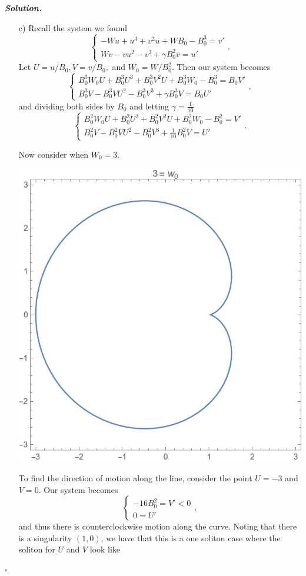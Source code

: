 \documentclass[12pt]{report}
\newenvironment{solution}[1][\it{Solution}]{\textbf{#1. } }{$\square$}
\begin{document}
\begin{solution}
\begin{enumerate}
        \item[c)]
        Recall the system we found
        \[
            \begin{cases}
                -Wu + u^3 + v^2u + WB_0 - B_0^3 = v'\\
                Wv - vu^2 - v^3 + \gamma B_0^2 v = u'
            \end{cases}.
        \]
        Let $U = u/B_0, V = v/B_0,$ and $W_0 = W/B_0^2$. Then our system becomes
        \[ 
            \begin{cases}
                B_0^3W_0U + B_0^3U^3 + B_0^3V^2U + B_0^3W_0 - B_0^3 = B_0V'\\
                B_0^3V - B_0^3VU^2 - B_0^3V^3 + \gamma B_0^3 V = B_0U'
            \end{cases},
        \]
        and dividing both sides by $B_0$ and letting $\gamma = \frac{1}{10}$
        \[ 
            \begin{cases}
                B_0^2W_0U + B_0^2U^3 + B_0^2V^2U + B_0^2W_0 - B_0^2 = V'\\
                B_0^2V - B_0^2VU^2 - B_0^2V^3 + \frac{1}{10} B_0^2 V = U'
            \end{cases}.
        \]
        
        \noindent
        Now consider when $W_0 = 3$.

        \begin{center}
            \includegraphics[width=.5\linewidth]{plots/1-1.jpg}
        \end{center}

        To find the direction of motion along the line, consider the point $U = -3$ and $V = 0$. Our system becomes
        \[ 
            \begin{cases}
                -16B_0^2 = V' < 0\\
                0 = U'
            \end{cases},
        \]
        and thus there is counterclockwise motion along the curve. Noting that there is a singularity $(1,0)$, we have that this is a one soliton case where the soliton for $U$ and $V$ look like


\end{enumerate}
\end{solution}
\end{document}
